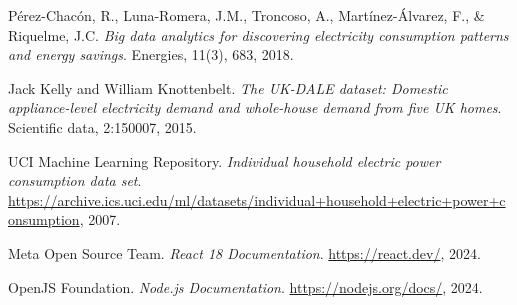 \documentclass[12pt,a4paper,spanish]{article}
\begin{document}
\begin{thebibliography}{99}

Pérez-Chacón, R., Luna-Romera, J.M., Troncoso, A., Martínez-Álvarez, F., \& Riquelme, J.C. \textit{Big data analytics for discovering electricity consumption patterns and energy savings}. 
Energies, 11(3), 683, 2018.

Jack Kelly and William Knottenbelt. \textit{The UK-DALE dataset: Domestic appliance-level electricity demand and whole-house demand from five UK homes}. 
Scientific data, 2:150007, 2015.

UCI Machine Learning Repository. \textit{Individual household electric power consumption data set}. 
\url{https://archive.ics.uci.edu/ml/datasets/individual+household+electric+power+consumption}, 2007.

Meta Open Source Team. \textit{React 18 Documentation}. 
\url{https://react.dev/}, 2024.

OpenJS Foundation. \textit{Node.js Documentation}. 
\url{https://nodejs.org/docs/}, 2024.

\end{thebibliography}
\end{document}
